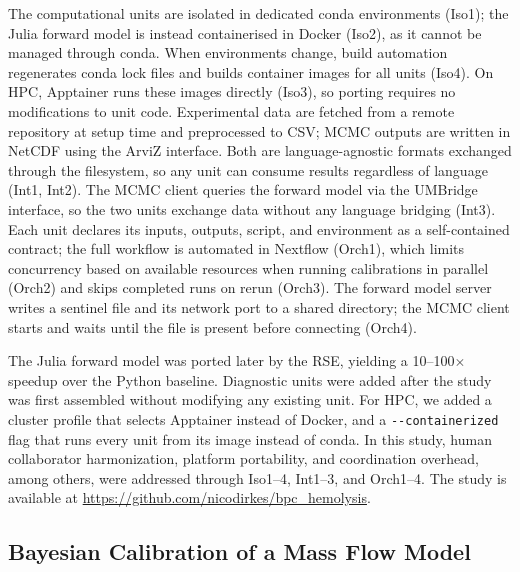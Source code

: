 \documentclass{eceasst}
\begin{document}
The computational units are isolated in dedicated conda environments (Iso1);
the Julia forward model is instead containerised in Docker (Iso2), as it cannot
be managed through conda. When environments change, build automation regenerates conda lock
files and builds container images for all units (Iso4). On HPC, Apptainer runs
these images directly (Iso3), so porting requires no modifications to unit code.
Experimental data are fetched from a remote repository at setup time and
preprocessed to CSV; MCMC outputs are written in NetCDF using the ArviZ
interface. Both are language-agnostic formats exchanged through the filesystem,
so any unit can consume results regardless of language (Int1, Int2). The MCMC client queries the
forward model via the UMBridge interface, so the two units exchange data
without any language bridging (Int3).
Each unit declares its inputs, outputs, script, and environment as a
self-contained contract; the full workflow is automated in Nextflow (Orch1),
which limits concurrency based on available resources when running calibrations
in parallel (Orch2) and skips completed runs on rerun (Orch3). The forward
model server writes a sentinel file and its network port to a shared
directory; the MCMC client starts and waits until the file is present before
connecting (Orch4).

The Julia forward model was ported later by the RSE, yielding a
10--100$\times$ speedup over the Python baseline. Diagnostic units were added
after the study was first assembled without modifying any existing unit.
For HPC, we added a cluster profile that selects Apptainer instead of Docker,
and a \texttt{-{}-containerized} flag that runs every unit from its image
instead of conda.
In this study, human collaborator harmonization, platform portability, and coordination overhead, among others, were addressed through Iso1--4, Int1--3, and Orch1--4.
The study is available at
\url{https://github.com/nicodirkes/bpc_hemolysis}.

\subsection{Bayesian Calibration of a Mass Flow Model}
\label{sec:usecase:massflow}
\end{document}
